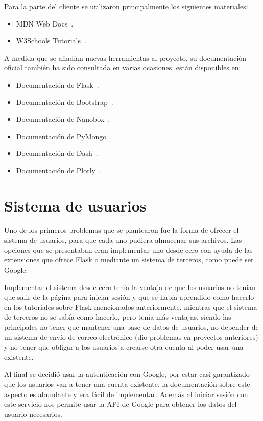 \noindent Para la parte del cliente se utilizaron principalmente los siguientes
materiales:
\begin{itemize}
	\item MDN Web Docs~\cite{mdn}.
	\item W3Schools Tutorials~\cite{w3schools}.
\end{itemize}

A medida que se añadían nuevas herramientas al proyecto, su documentación
oficial también ha sido consultada en varias ocasiones, están disponibles en:
\begin{itemize}
	\item Documentación de Flask~\cite{doc:flask}.
	\item Documentación de Bootstrap~\cite{doc:bootstrap}.
	\item Documentación de Nanobox~\cite{doc:nanobox}.
	\item Documentación de PyMongo~\cite{doc:pymongo}.
	\item Documentación de Dash~\cite{doc:dash}.
	\item Documentación de Plotly~\cite{doc:plotly}.
\end{itemize}

\section{Sistema de usuarios}

Uno de los primeros problemas que se plantearon fue la forma de ofrecer el
sistema de usuarios, para que cada uno pudiera almacenar sus archivos. Las
opciones que se presentaban eran implementar uno desde cero con ayuda de las
extensiones que ofrece Flask o mediante un sistema de terceros, como puede ser
Google.

Implementar el sistema desde cero tenía la ventaja de que los usuarios no tenían
que salir de la página para iniciar sesión y que se había aprendido como hacerlo
en los tutoriales sobre Flask mencionados anteriormente, mientras que el sistema
de terceros no se sabía como hacerlo, pero tenía más ventajas, siendo las
principales no tener que mantener una base de datos de usuarios, no depender de
un sistema de envío de correo electrónico (dio problemas en proyectos
anteriores) y no tener que obligar a los usuarios a crearse otra cuenta al poder
usar una existente.

Al final se decidió usar la autenticación con Google, por estar casi garantizado
que los usuarios van a tener una cuenta existente, la documentación sobre este
aspecto es abundante y era fácil de implementar. Además al iniciar sesión con
este servicio nos permite usar la API de Google para obtener los datos del
usuario necesarios.

